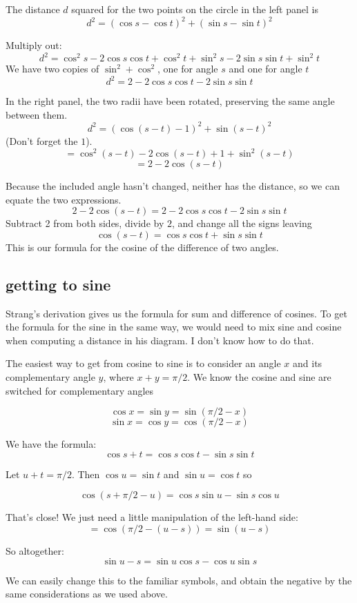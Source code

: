 \documentclass[11pt, oneside]{article}
\begin{document}
The distance $d$ squared for the two points on the circle in the left panel is
\[ d^2 = (\cos s - \cos t)^2 + (\sin s - \sin t)^2 \]

Multiply out:
\[ d^2 = \cos^2 s - 2 \cos s \cos t  + \cos^2 t +  \sin^2 s - 2 \sin s \sin t + \sin^2 t \]
We have two copies of $\sin^2 + \cos^2$, one for angle $s$  and one for angle $t$
\[ d^2 = 2 - 2 \cos s \cos t - 2 \sin s \sin t \]

In the right panel, the two radii have been rotated, preserving the same angle between them.
\[  d^2 = (\cos (s-t) - 1)^2 + \sin(s-t)^2 \]
(Don't forget the $1$).
\[ = \cos^2 (s-t) - 2 \cos(s-t) + 1 + \sin^2 (s-t) \]
\[ = 2 - 2 \cos(s-t) \]

Because the included angle hasn't changed, neither has the distance, so we can equate the two expressions.  
\[ 2 - 2 \cos(s-t) = 2 - 2 \cos s \cos t - 2 \sin s \sin t \]
Subtract 2 from both sides, divide by $2$, and change all the signs leaving
\[ \cos (s - t) = \cos s \cos t + \sin s \sin t \]
This is our formula for the cosine of the difference of two angles.

\subsection*{getting to sine}

Strang's derivation gives us the formula for sum and difference of cosines.  To get the formula for the sine in the same way, we would need to mix sine and cosine when computing a distance in his diagram.  I don't know how to do that.

The easiest way to get from cosine to sine is to consider an angle $x$ and its complementary angle $y$, where $x + y = \pi/2$.  We know the cosine and sine are switched for complementary angles

\[ \cos x = \sin y = \sin (\pi/2 - x) \]
\[ \sin x = \cos y = \cos (\pi/2 - x) \]

We have the formula:
\[ \cos s + t = \cos s \cos t - \sin s \sin t \]

Let $u + t = \pi/2$.  Then $\cos u = \sin t$ and $\sin u = \cos t$ so

\[ \cos (s + \pi/2 - u) = \cos s \sin u - \sin s \cos u \]

That's close!  We just need a little manipulation of the left-hand side:
\[ = \cos (\pi/2 - (u - s)) = \sin (u - s) \]

So altogether: 
\[ \sin u - s = \sin u \cos s - \cos u \sin s \]

We can easily change this to the familiar symbols, and obtain the negative by the same considerations as we used above.
\end{document}
